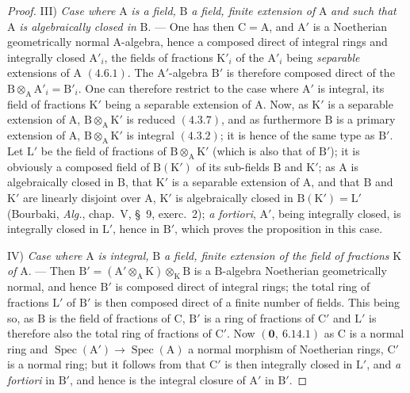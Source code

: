 \begin{proof}
III) \emph{Case where} $\mathrm{A}$ \emph{is a field,} $\mathrm{B}$ \emph{a field, finite extension of} $\mathrm{A}$ \emph{and such that} $\mathrm{A}$ \emph{is algebraically
closed in} $\mathrm{B}$. --- One has then $\mathrm{C}=\mathrm{A}$, and $\mathrm{A}'$ is a Noetherian geometrically
normal $\mathrm{A}$-algebra, hence a composed direct of integral rings and integrally closed $\mathrm{A}'_i$, the
fields of fractions $\mathrm{K}'_i$ of the $\mathrm{A}'_i$ being \emph{separable} extensions of $\mathrm{A}$ $(4.6.1)$. The $\mathrm{A}'$-algebra $\mathrm{B}'$
is therefore composed direct of the $\mathrm{B}\otimes_\mathrm{A}\mathrm{A}'_i=\mathrm{B}'_i$. One can therefore restrict to the case where $\mathrm{A}'$ is
integral, its field of fractions $\mathrm{K}'$ being a separable extension of $\mathrm{A}$. Now, as $\mathrm{K}'$
is a separable extension of $\mathrm{A}$, $\mathrm{B}\otimes_\mathrm{A}\mathrm{K}'$ is reduced $(4.3.7)$, and as furthermore $\mathrm{B}$ is a
primary extension of $\mathrm{A}$, $\mathrm{B}\otimes_\mathrm{A}\mathrm{K}'$ is integral $(4.3.2)$; it is hence of the same type as $\mathrm{B}'$.
Let $\mathrm{L}'$ be the field of fractions of $\mathrm{B}\otimes_\mathrm{A}\mathrm{K}'$ (which is also that of $\mathrm{B}'$); it is obviously a
composed field of $\mathrm{B}(\mathrm{K}')$ of its sub-fields $\mathrm{B}$ and $\mathrm{K}'$; as $\mathrm{A}$ is algebraically closed in $\mathrm{B}$,
that $\mathrm{K}'$ is a separable extension of $\mathrm{A}$, and that $\mathrm{B}$ and $\mathrm{K}'$ are linearly disjoint over $\mathrm{A}$,
$\mathrm{K}'$ is algebraically closed in $\mathrm{B}(\mathrm{K}')=\mathrm{L}'$ (Bourbaki, \emph{Alg.}, chap.~V, \S~9, exerc.~2);
\emph{a fortiori}, $\mathrm{A}'$, being integrally closed, is integrally closed in $\mathrm{L}'$, hence in $\mathrm{B}'$,
which proves the proposition in this case.

IV) \emph{Case where} $\mathrm{A}$ \emph{is integral,} $\mathrm{B}$ \emph{a field, finite extension of the field of fractions} $\mathrm{K}$ \emph{of} $\mathrm{A}$. ---
Then $\mathrm{B}'=(\mathrm{A}'\otimes_\mathrm{A}\mathrm{K})\otimes_\mathrm{K}\mathrm{B}$ is a $\mathrm{B}$-algebra Noetherian geometrically normal, and
hence $\mathrm{B}'$ is composed direct of integral rings; the total ring of fractions $\mathrm{L}'$ of $\mathrm{B}'$
is then composed direct of a finite number of fields. This being so, as $\mathrm{B}$ is the field of
fractions of $\mathrm{C}$, $\mathrm{B}'$ is a ring of fractions of $\mathrm{C}'$ and $\mathrm{L}'$ is therefore also the total ring of
fractions of $\mathrm{C}'$. Now $(\mathbf{0},~6.14.1)$ as $\mathrm{C}$ is a normal ring and $\operatorname{Spec}(\mathrm{A}')\to\operatorname{Spec}(\mathrm{A})$
a normal morphism of Noetherian rings, $\mathrm{C}'$ is a normal ring; but it follows from
 that $\mathrm{C}'$ is then integrally closed in $\mathrm{L}'$, and \emph{a fortiori} in $\mathrm{B}'$, and hence
is the integral closure of $\mathrm{A}'$ in $\mathrm{B}'$.


\end{proof}
